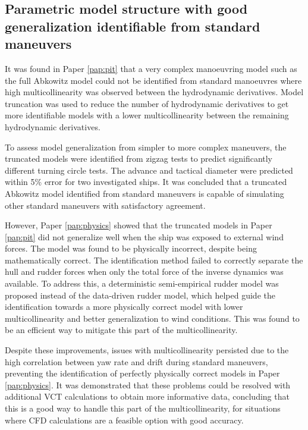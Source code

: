 \subsection*{Parametric model structure with good generalization identifiable from standard maneuvers}
It was found in Paper \ref{pap:pit} that a very complex manoeuvring model such as the full Abkowitz model could not be identified from standard manoeuvres where high multicollinearity was observed between the hydrodynamic derivatives.  Model truncation was used to reduce the number of hydrodynamic derivatives to get more identifiable models with a lower multicollinearity between the remaining hydrodynamic derivatives.

To assess model generalization from simpler to more complex maneuvers, the truncated models were identified from zigzag tests to predict significantly different turning circle tests. The advance and tactical diameter were predicted within 5\% error for two investigated ships. It was concluded that a truncated Abkowitz model identified from standard maneuvers is capable of simulating other standard maneuvers with satisfactory agreement.

However, Paper \ref{pap:physics} showed that the truncated models in Paper \ref{pap:pit} did not generalize well when the ship was exposed to external wind forces. The model was found to be physically incorrect, despite being mathematically correct. The identification method failed to correctly separate the hull and rudder forces when only the total force of the inverse dynamics was available. To address this, a deterministic semi-empirical rudder model was proposed instead of the data-driven rudder model, which helped guide the identification towards a more physically correct model with lower multicollinearity and better generalization to wind conditions. This was found to be an efficient way to mitigate this part of the multicollinearity.

Despite these improvements, issues with multicollinearity persisted due to the high correlation between yaw rate and drift during standard maneuvers, preventing the identification of perfectly physically correct models in Paper \ref{pap:physics}. It was demonstrated that these problems could be resolved with additional VCT calculations to obtain more informative data, concluding that this is a good way to handle this part of the multicollinearity, for situations where CFD calculations are a feasible option with good accuracy.


